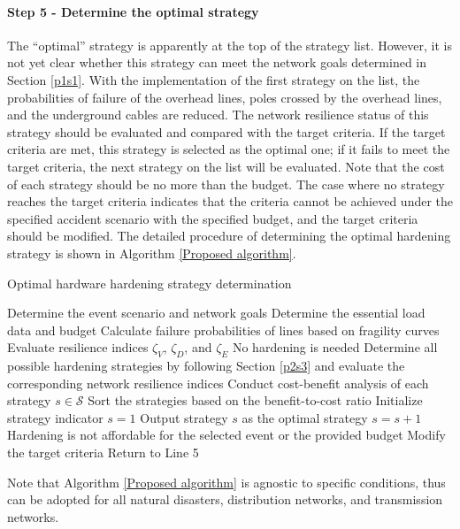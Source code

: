 \documentclass[conference]{IEEEtran}
\begin{document}
 \paragraph{Step 5 - Determine the optimal strategy}\label{p2s5}
The ``optimal'' strategy is apparently at the top of the strategy list. However, it is not yet clear whether this strategy can meet the network goals determined in Section \ref{p1s1}. With the implementation of the first strategy on the list, the probabilities of failure of the overhead lines, poles crossed by the overhead lines, and the underground cables are reduced. The network resilience status of this strategy should be evaluated and compared with the target criteria. If the target criteria are met, this strategy is selected as the optimal one; if it fails to meet the target criteria, the next strategy on the list will be evaluated. Note that the cost of each strategy should be no more than the budget. The case where no strategy reaches the target criteria indicates that the criteria cannot be achieved under the specified accident scenario with the specified budget, and the target criteria should be modified. The detailed procedure of determining the optimal hardening strategy is shown in Algorithm \ref{Proposed algorithm}.
\begin{algorithm}[!htb]
\caption{Optimal hardware hardening strategy determination}\label{Proposed algorithm}
\begin{algorithmic}[1]
\State Determine the event scenario and network goals
\State Determine the essential load data and budget
\State Calculate failure probabilities of lines based on fragility curves
\State Evaluate resilience indices $\zeta_V$, $\zeta_D$, and $\zeta_E$
\State No hardening is needed
\Else
    \State Determine all possible hardening strategies by following Section \ref{p2s3} and evaluate the corresponding network resilience indices
    \State Conduct cost-benefit analysis of each strategy $s \in \mathcal{S}$
    \State Sort the strategies based on the benefit-to-cost ratio
    \State Initialize strategy indicator $s=1$
    \State Output strategy $s$ as the optimal strategy
    \Else
    \State $s=s+1$
        \EndIf
    \EndWhile
        \State Hardening is not affordable for the selected event or the provided budget
        \State Modify the target criteria
\State Return to Line 5
\EndIf
\EndIf
\end{algorithmic}
\end{algorithm}
 Note that Algorithm \ref{Proposed algorithm} is agnostic to specific conditions, thus can be adopted for all natural disasters, distribution networks, and transmission networks.
\end{document}
